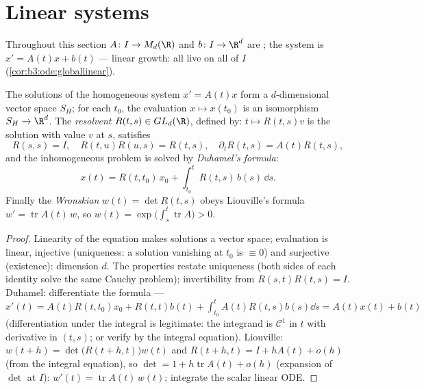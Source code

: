 \section{Linear systems}

Throughout this section $A \colon I \to M_d(\R)$ and $b
\colon I \to \R^d$ are ; the system is $x' = A(t)x
+ b(t)$ --- linear growth: all  live on all
of $I$ (\cref{cor:b3:ode:globallinear}).

\begin{theorem}[Structure]\label{thm:b3:ode:linearstructure}
The solutions of the homogeneous system $x' = A(t)x$ form a
$d$-dimensional vector space $S_H$; for each $t_0$, the
evaluation $x \mapsto x(t_0)$ is an isomorphism $S_H \to
\R^d$. The \emph{resolvent} $R(t, s) \in GL_d(\R)$, defined by: $t \mapsto R(t,
s)v$ is the solution with value $v$ at $s$, satisfies
\[
R(s,s) = I,\quad R(t, u)R(u, s) = R(t, s),\quad
\partial_tR(t,s) = A(t)R(t,s),
\]
and the inhomogeneous problem is solved by \emph{Duhamel's
formula}:
\[
x(t) = R(t, t_0)\,x_0 + \int_{t_0}^{t}R(t, s)\,b(s)\,\dd s .
\]
Finally the \emph{Wronskian} $w(t) = \det
R(t, s)$ obeys Liouville's formula $w' =
\operatorname{tr}A(t)\,w$, so $w(t) =
\exp\bigl(\int_s^t\operatorname{tr}A\bigr) > 0$.
\end{theorem}

\begin{proof}
Linearity of the equation makes solutions a vector space;
evaluation is linear, injective (uniqueness: a solution
vanishing at $t_0$ is $\equiv 0$) and surjective (existence):
dimension $d$. The  properties restate uniqueness
(both sides of each identity solve the same Cauchy problem);
invertibility from $R(s,t)R(t,s) = I$. Duhamel: differentiate
the formula --- $x'(t) = A(t)R(t,t_0)x_0 + R(t,t)b(t) +
\int_{t_0}^tA(t)R(t,s)b(s)\dd s = A(t)x(t) + b(t)$
(differentiation under the integral is legitimate: the
integrand is $\mathcal C^1$ in $t$ with  derivative
in $(t,s)$; or verify by the integral equation). Liouville:
$w(t + h) = \det\bigl(R(t+h, t)\bigr)w(t)$ and $R(t + h, t) =
I + hA(t) + o(h)$ (from the integral equation), so $\det = 1
+ h\operatorname{tr}A(t) + o(h)$ (expansion of $\det$ at
$I$): $w'(t) = \operatorname{tr}A(t)\,w(t)$; integrate the
scalar linear ODE.
\end{proof}

